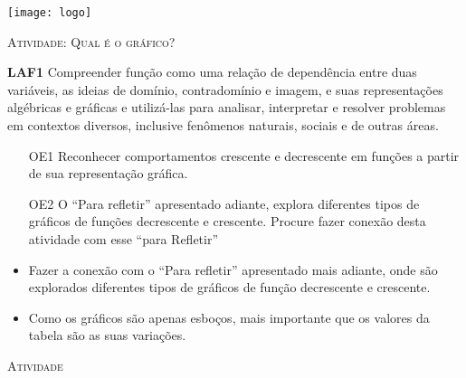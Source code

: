 \documentclass[10 pt,usenames,dvipsnames, oneside]{article}
\begin{document}
\begin{center}
  \begin{minipage}[l]{3cm}
\texttt{[image: logo]}    
\end{minipage}\hfill
\begin{minipage}[r]{.8\textwidth}
 {\Large \scshape Atividade: Qual é o gráfico?}  
\end{minipage}
\end{center}
\vspace{.2cm}

\ifdefined\prof
\begin{objetivos}
\item \textbf{LAF1} Compreender função como uma relação de dependência entre duas variáveis, as ideias de domínio, contradomínio e imagem, e suas representações algébricas e gráficas e utilizá-las para analisar, interpretar e resolver problemas em contextos diversos, inclusive fenômenos naturais, sociais e de outras áreas.
\end{objetivos}

\begin{goals}
\begin{enumerate}

\item[OE1] Reconhecer comportamentos crescente e decrescente em funções a partir de sua representação gráfica.


\item[OE2] O “Para refletir”{} apresentado adiante, explora diferentes tipos de gráficos de funções decrescente e crescente. Procure fazer conexão desta atividade com esse “para Refletir”

\end{enumerate}
\tcblower

\begin{itemize}
\item Fazer a conexão com o “Para refletir”{} apresentado mais adiante, onde são explorados diferentes tipos de gráficos de função decrescente e crescente.

\item Como os gráficos são apenas esboços, mais importante que os valores da tabela são as suas variações.
\end{itemize}

\end{goals}

\bigskip
\begin{center}
{\large \scshape Atividade}
\end{center}
\fi
\end{document}
